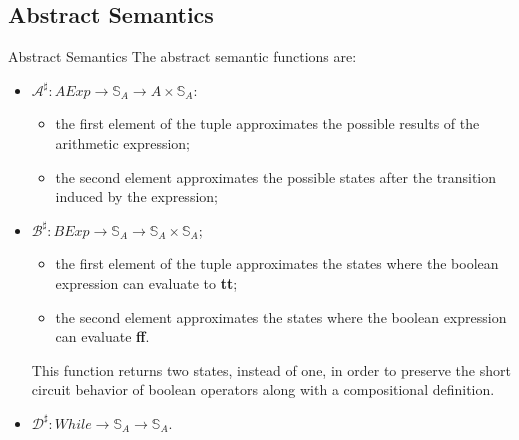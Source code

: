 \subsection{Abstract Semantics}

\begin{frame}{Abstract Semantics}
    The abstract semantic functions are:
    \begin{itemize}
        \item $\mathcal{A}^\sharp : AExp \to \mathbb{S}_{A} \to A \times \mathbb{S}_{A}$:
        \begin{itemize}
            \item the first element of the tuple approximates the possible results of the arithmetic expression;
            \item the second element approximates the possible states after the transition induced by the expression;
        \end{itemize}
        \item $\mathcal{B}^\sharp : BExp \to \mathbb{S}_{A} \to \mathbb{S}_A \times \mathbb{S}_A$;
        \begin{itemize}
            \item the first element of the tuple approximates the states where the boolean expression can evaluate to \textbf{tt};
            \item the second element approximates the states where the boolean expression can evaluate \textbf{ff}.
        \end{itemize}
        This function returns two states, instead of one, in order to preserve the short circuit behavior of boolean operators along with a compositional definition.
        \item $\mathcal{D}^\sharp : While \to \mathbb{S}_{A} \to\mathbb{S}_{A}$.
    \end{itemize}
\end{frame}

